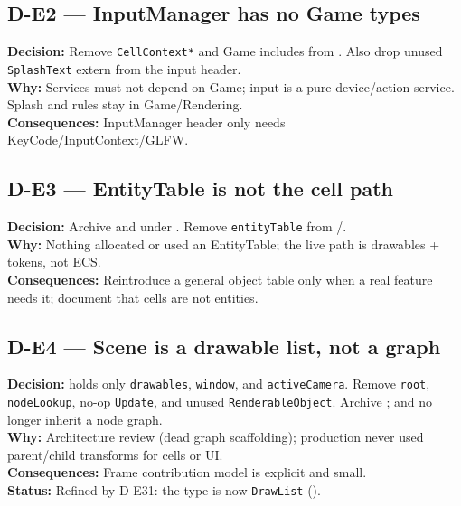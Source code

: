 \subsection*{D-E2 --- InputManager has no Game types}
\begin{decisionbox}[title={D-E2 \quad 2026-07-28}]
\textbf{Decision:} Remove \texttt{CellContext*} and Game includes from
. Also drop unused \texttt{SplashText} extern from the
input header.\\
\textbf{Why:} Services must not depend on Game; input is a pure device/action
service. Splash and rules stay in Game/Rendering.\\
\textbf{Consequences:} InputManager header only needs KeyCode/InputContext/GLFW.
\end{decisionbox}

\subsection*{D-E3 --- EntityTable is not the cell path}
\begin{decisionbox}[title={D-E3 \quad 2026-07-28}]
\textbf{Decision:} Archive  and 
under . Remove \texttt{entityTable} from
/.\\
\textbf{Why:} Nothing allocated or used an EntityTable; the live path is
drawables + tokens, not ECS.\\
\textbf{Consequences:} Reintroduce a general object table only when a real
feature needs it; document that cells are not entities.
\end{decisionbox}

\subsection*{D-E4 --- Scene is a drawable list, not a graph}
\begin{decisionbox}[title={D-E4 \quad 2026-07-28}]
\textbf{Decision:}  holds only \texttt{drawables},
\texttt{window}, and \texttt{activeCamera}. Remove \texttt{root},
\texttt{nodeLookup}, no-op \texttt{Update}, and unused
\texttt{RenderableObject}. Archive ; 
and  no longer inherit a node graph.\\
\textbf{Why:} Architecture review (dead graph scaffolding); production never
used parent/child transforms for cells or UI.\\
\textbf{Consequences:} Frame contribution model is explicit and small.\\
\textbf{Status:} Refined by D-E31: the type is now \texttt{DrawList}
().
\end{decisionbox}

